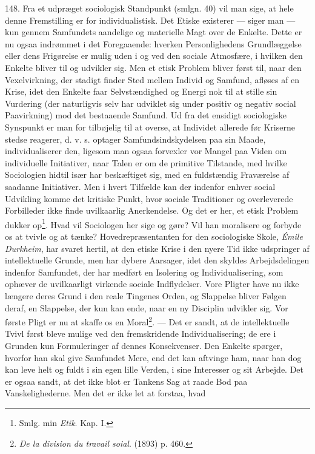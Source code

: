 \documentclass[12pt,a4paper]{book}
\newcommand{\apage}[1]{\marginnote{\footnotesize\textit{[#1]}}}
\begin{document}
148. Fra et udpræget sociologisk Standpunkt (smlgn. 40) vil man sige, at hele denne
Fremstilling er for individualistisk. Det Etiske existerer --- siger man --- kun gennem
Samfundets aandelige og materielle Magt over de Enkelte. Dette er nu ogsaa indrømmet i det
Foregaaende: hverken \apage{354} Personlighedens Grundlæggelse eller dens Frigørelse er mulig uden i og
ved den sociale Atmosfære, i hvilken den Enkelte bliver til og udvikler sig. Men et etisk
Problem bliver først til, naar den Vexelvirkning, der stadigt finder Sted mellem Individ og
Samfund, afløses af en Krise, idet den Enkelte faar Selvstændighed og Energi nok til at
stille sin Vurdering (der naturligvis selv har udviklet sig under positiv og negativ social
Paavirkning) mod det bestaaende Samfund. Ud fra det ensidigt sociologiske Synspunkt er man
for tilbøjelig til at overse, at Individet allerede før Kriserne stedse reagerer, d. v. s.
optager Samfundsindskydelsen paa sin Maade, individualiserer den, ligesom man ogsaa
forvexler vor Mangel paa Viden om individuelle Initiativer, naar Talen er om de primitive
Tilstande, med hvilke Sociologien hidtil især har beskæftiget sig, med en fuldstændig
Fraværelse af saadanne Initiativer. Men i hvert Tilfælde kan der indenfor enhver social
Udvikling komme det kritiske Punkt, hvor sociale Traditioner og overleverede Forbilleder
ikke finde uvilkaarlig Anerkendelse. Og det er her, et etisk Problem dukker op\footnote{Smlg.
min \emph{Etik}. Kap. I.}. Hvad vil Sociologen her sige og gøre? Vil han moralisere og
forbyde os at tvivle og at tænke? Hovedrepræsentanten for den sociologiske Skole,
\emph{Émile Durkheim}, har svaret hertil, at den etiske Krise i den nyere Tid ikke
udspringer af intellektuelle Grunde, men har dybere Aarsager, idet den skyldes
Arbejdsdelingen indenfor Samfundet, der har medført en Isolering og Individualisering, som
ophæver de uvilkaarligt virkende sociale Indflydelser. Vore Pligter have nu ikke længere
deres Grund i den reale Tingenes Orden, og Slappelse bliver Følgen deraf, en Slappelse, der
kun kan ende, naar en ny Disciplin udvikler sig. Vor første Pligt er nu at skaffe os en
Moral\footnote{\emph{De la division du travail soial}. (1893) p. 460.}. --- Det er sandt,
at de intellektuelle Tvivl først bleve mulige ved den fremskridende Individualisering; de
ere i Grunden kun Formuleringer af dennes Konsekvenser. Den Enkelte spørger, hvorfor han
skal give Samfundet Mere, end det kan aftvinge \apage{355} ham, naar han dog kan leve helt og fuldt i
sin egen lille Verden, i sine Interesser og sit Arbejde. Det er ogsaa sandt, at det ikke
blot er Tankens Sag at raade Bod paa Vanskelighederne. Men det er ikke let at forstaa, hvad
\end{document}
